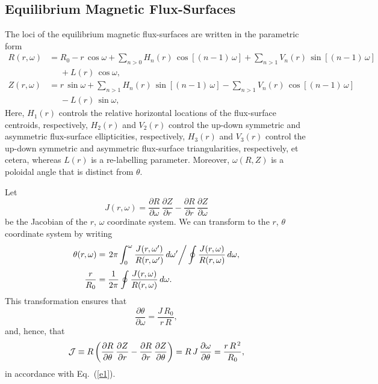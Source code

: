 \documentclass[12pt,prb,aps]{revtex4-1}
\begin{document}
\subsection{Equilibrium Magnetic Flux-Surfaces}
The loci of the equilibrium magnetic flux-surfaces are written in the parametric form\,\cite{con0,con,fitz93,greene,gim}
\begin{align}
R(r,\omega) &= R_0-r\,\cos\omega+\sum_{n>0}H_n(r)\,\cos[(n-1)\,\omega]+\sum_{n>1}V_n(r)\,\sin[(n-1)\,\omega]\nonumber\\[0.5ex]&
\phantom{=}+L(r)\,\cos\omega,\label{e10a}\\[0.5ex]
Z(r,\omega)&= r\,\sin\omega + \sum_{n>1}H_n(r)\,\sin[(n-1)\,\omega]- \sum_{n>1}V_n(r)\,\cos[(n-1)\,\omega]\nonumber\\[0.5ex]&\phantom{=}-L(r)\,\sin\omega,\label{e11a}
\end{align}
Here, $H_1(r)$  controls the relative horizontal locations of the flux-surface centroids, respectively, $H_2(r)$ and $V_2(r)$ control the 
up-down symmetric and asymmetric flux-surface ellipticities, respectively, $H_3(r)$ and
$V_3(r)$ control the up-down symmetric and asymmetric flux-surface triangularities, respectively, et cetera, whereas $L(r)$ is a
re-labelling parameter. Moreover, $\omega(R,Z)$ is a  poloidal angle that is distinct from $\theta$.

Let
\begin{equation}
J(r,\omega) = \frac{\partial R}{\partial\omega}\,\frac{\partial Z}{\partial r} -\frac{\partial R}{\partial r}\,\frac{\partial Z}{\partial \omega}
\end{equation}
be the Jacobian of the $r$, $\omega$ coordinate system. We can transform to the $r$, $\theta$ coordinate system 
by writing
\begin{align}\label{e11}
\theta(r,\omega) &= \left.2\pi\int_0^\omega \frac{J(r,\omega')}{R(r,\omega')}\,d\omega'\right/\oint\frac{J(r,\omega)}{R(r,\omega)}\,d\omega,\\[0.5ex]
\frac{r}{R_0}&=\frac{1}{2\pi}\oint\frac{J(r,\omega)}{R(r,\omega)}\,d\omega.\label{e12}
\end{align}
This transformation ensures that 
\begin{equation}
\frac{\partial\theta}{\partial\omega} = \frac{J\,R_0}{r\,R},
\end{equation}
and, hence, that 
\begin{equation}
{\cal J} \equiv R\left(\frac{\partial R}{\partial\theta}\,\frac{\partial Z}{\partial r} -\frac{\partial R}{\partial r}\,\frac{\partial Z}{\partial\theta}\right)
= R\,J\,\frac{\partial\omega}{\partial\theta} =\frac{r\,R^{\,2}}{R_0},
\end{equation}
in accordance with Eq.~(\ref{e1}). 
\end{document}
